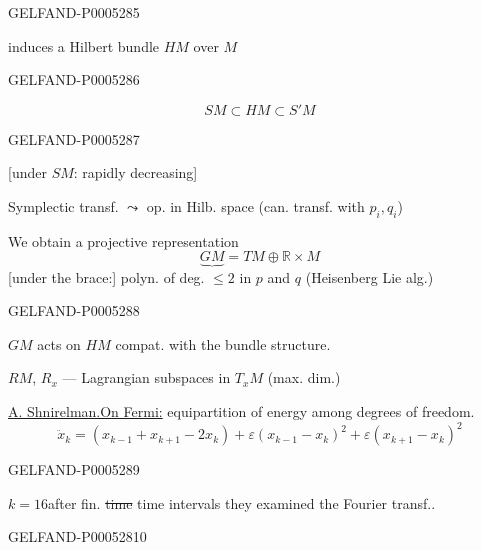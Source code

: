 \begin{GelfandAdjacentEvidence}{GELFAND-P000528}{5}

induces a Hilbert bundle $HM$ over $M$
\end{GelfandAdjacentEvidence}
\begin{GelfandAdjacentEvidence}{GELFAND-P000528}{6}

\[
SM\subset HM\subset S'M
\]
\end{GelfandAdjacentEvidence}
\begin{GelfandAdjacentEvidence}{GELFAND-P000528}{7}

[under $SM$: rapidly decreasing]

Symplectic transf. $\leadsto$ op. in Hilb. space (can. transf. with $p_i,q_i$)

We obtain a projective representation
\[
\underbrace{GM}=TM\oplus\mathbb R\times M
\]
[under the brace:] polyn. of deg. $\leq2$ in $p$ and $q$ (Heisenberg Lie alg.)
\end{GelfandAdjacentEvidence}
\begin{GelfandAdjacentEvidence}{GELFAND-P000528}{8}


$GM$ acts on $HM$ compat. with the bundle structure.

$RM$, $R_x$ — Lagrangian subspaces in $T_xM$ (max. dim.)

\uline{A. Shnirelman.}\qquad\uline{On Fermi:} equipartition of energy among degrees of freedom.
\[
\ddot x_k=(x_{k-1}+x_{k+1}-2x_k)+\varepsilon(x_{k-1}-x_k)^2
 +\varepsilon(x_{k+1}-x_k)^2
\]
\end{GelfandAdjacentEvidence}
\begin{GelfandAdjacentEvidence}{GELFAND-P000528}{9}



\underline{$k=16$}\qquad after fin. \sout{time} time intervals they examined the Fourier transf..
\end{GelfandAdjacentEvidence}
\begin{GelfandAdjacentEvidence}{GELFAND-P000528}{10}

\end{GelfandAdjacentEvidence}
